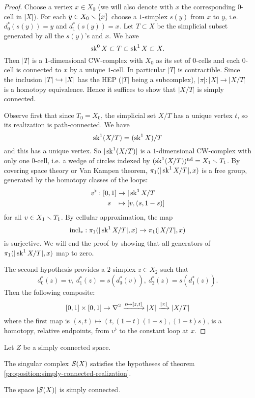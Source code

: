 \begin{proof}
Choose a vertex $x\in X_0$ (we will also denote with $x$ the corresponding $0$-cell in $|X|$). For each $y\in X_0\sm\cb{x}$ choose a $1$-simplex $s(y)$ from $x$ to $y$, i.e. $d_0^*(s(y))=y$ and $d_1^*(s(y))=x$. Let $T\subset X$ be the simplicial subset generated by all the $s(y)$'s and $x$. We have
\[\sk^0 X\subset T\subset\sk^{1} X\subset X.\]
Then $|T|$ is a $1$-dimensional CW-complex with $X_0$ as its set of $0$-cells and each $0$-cell is connected to $x$ by a unique $1$-cell. In particular $|T|$ is contractible. Since the inclusion $|T|\into|X|$ has the HEP ($|T|$ being a subcomplex), $|\pi|:|X|\to|X/T|$ is a homotopy equivalence. Hence it suffices to show that $|X/T|$ is simply connected.

Observe first that since $T_0=X_0$, the simplicial set $X/T$ has a unique vertex $t$, so its realization is path-connected. We have
\[\sk^1(X/T)=(\sk^1 X)/T\]
and this has a unique vertex. So $|\sk^1(X/T)|$ is a $1$-dimensional CW-complex with only one $0$-cell, i.e. a wedge of circles indexed by $(\sk^1(X/T))^\text{nd}=X_1\sm T_1$. By covering space theory or Van Kampen theorem, $\pi_1(|\sk^1 X/T|,x)$ is a free group, generated by the homotopy classes of the loops:
\begin{align*}
v^\flat:[0,1]&\to|\sk^1 X/T|\\
s\ \ \,&\mapsto[v,(s,1-s)]
\end{align*}
for all $v\in X_1\sm T_1$. By cellular approximation, the map
\[\incl_*:\pi_1(|\sk^1 X/T|,x)\to\pi_1(|X/T|,x)\]
is surjective. We will end the proof by showing that all generators of $\pi_1(|\sk^1 X/T|,x)$ map to zero.

The second hypothesis provides a $2$-simplex $z\in X_2$ such that
\[d_0^*(z)=v,\ d_1^*(z)=s(d_0^*(v)),\ d_2^*(z)=s(d_1^*(z)).\]
Then the following composite:
\[
[0,1]\times[0,1]\to\sx{2}\xto{t\mapsto[z,t]}|X|\xto{|\pi|}|X/T|
\]
where the first map is $(s,t)\mapsto(t,(1-t)(1-s),(1-t)s)$, is a homotopy, relative endpoints, from $v^\flat$ to the constant loop at $x$.\alvaropls
\end{proof}

\begin{corollary}\label{corollary:simply-connected-realization-of-singular-complex}
Let $Z$ be a simply connected space.
\begin{numerate}
\item The singular complex $\S(X)$ satisfies the hypotheses of theorem \ref{proposition:simply-connected-realization}.
\item The space $|\S(X)|$ is simply connected.
\end{numerate}
\end{corollary}

